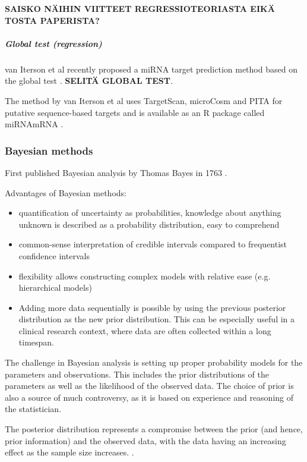 \textbf{SAISKO NÄIHIN VIITTEET REGRESSIOTEORIASTA EIKÄ TOSTA PAPERISTA?}


\subparagraph{Global test (regression)}\label{global-test-regression}

van Iterson et al recently proposed a miRNA target prediction method based on
the global test \citep{vanIterson2013}. \textbf{SELITÄ GLOBAL TEST}.

The method by van Iterson et al uses TargetScan, microCosm and PITA for
putative sequence-based targets and is available as an R package called
miRNAmRNA \citep{vanItersonWeb}.





\subsubsection{Bayesian methods}\label{bayesian-methods}

First published Bayesian analysis by Thomas Bayes in 1763 \citep{Gelman2013}.

Advantages of Bayesian methods:
\begin{itemize}
  \item
  quantification of uncertainty as probabilities, knowledge about anything
  unknown is described as a probability distribution, easy to comprehend
  \item
  common-sense interpretation of credible intervals compared to frequentist
  confidence intervals
  \item
  flexibility allows constructing complex models with relative ease (e.g.
  hierarchical models)
  \item
  Adding more data sequentially is possible by using the previous posterior
  distribution as the new prior distribution. This can be especially useful in
  a clinical research context, where data are often collected within a long
  timespan.
\end{itemize}
The challenge in Bayesian analysis is setting up proper probability models for
the parameters and observations. \citep{Gelman2013} This includes the prior
distributions of the parameters as well as the likelihood of the observed data.
The choice of prior is also a source of much controversy, as it is based
on experience and reasoning of the statistician.

The posterior distribution represents a compromise between the prior (and
hence, prior information) and the observed data, with the data having an
increasing effect as the sample size increases. \citep{Gelman2013}.

